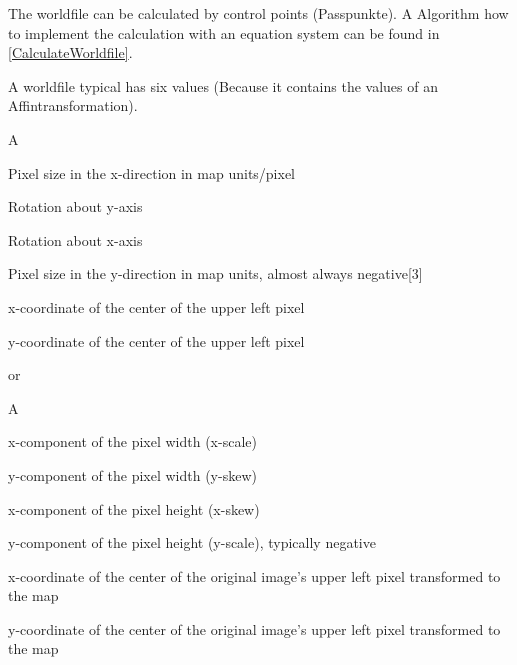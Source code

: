 The worldfile can be calculated by control points (Passpunkte).
A Algorithm how to implement
the calculation with an equation system can be found in \ref{CalculateWorldfile}.


A worldfile typical has six values (Because it contains the values of an Affintransformation).

\begin{labeling}[:]{A}
    \item[A]Pixel size in the x-direction in map units/pixel
    \item[D]Rotation about y-axis
    \item[B]Rotation about x-axis
    \item[E]Pixel size in the y-direction in map units, almost always negative[3]
    \item[C]x-coordinate of the center of the upper left pixel
    \item[F]y-coordinate of the center of the upper left pixel
\end{labeling}

or

\begin{labeling}[:]{A}
    \item[A]x-component of the pixel width (x-scale)
    \item[D]y-component of the pixel width (y-skew)
    \item[B]x-component of the pixel height (x-skew)
    \item[E]y-component of the pixel height (y-scale), typically negative
    \item[C]x-coordinate of the center of the original image's upper left pixel transformed to the map
    \item[F]y-coordinate of the center of the original image's upper left pixel transformed to the map
\end{labeling}

